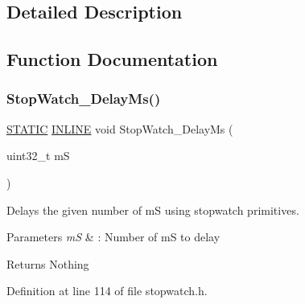\subsection{Detailed Description}


\subsection{Function Documentation}
\mbox{\label{group___stop___watch_gaa3bfba465962b310e4a5bd18292e8f87}} 
\subsubsection{\texorpdfstring{Stop\+Watch\+\_\+\+Delay\+Ms()}{StopWatch\_DelayMs()}}
{\footnotesize\ttfamily \hyperlink{group___l_p_c___types___public___macros_ga10b2d890d871e1489bb02b7e70d9bdfb}{S\+T\+A\+T\+IC} \hyperlink{spifi__18xx__43xx_8h_a2eb6f9e0395b47b8d5e3eeae4fe0c116}{I\+N\+L\+I\+NE} void Stop\+Watch\+\_\+\+Delay\+Ms (\begin{DoxyParamCaption}\item[{uint32\+\_\+t}]{mS }\end{DoxyParamCaption})}



Delays the given number of mS using stopwatch primitives. 


\begin{DoxyParams}{Parameters}
{\em mS} & \+: Number of mS to delay \\
\hline
\end{DoxyParams}
\begin{DoxyReturn}{Returns}
Nothing 
\end{DoxyReturn}


Definition at line 114 of file stopwatch.\+h.

\mbox{\label{group___stop___watch_ga744f358982209fe277eb21843e88a2d9}} 
